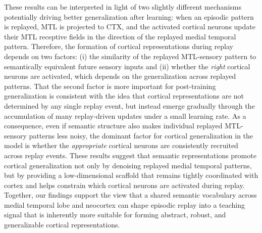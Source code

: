 \documentclass{article}
\begin{document}
\newline\newline
These results can be interpreted in light of two slightly different mechanisms potentially driving better generalization after learning: when an episodic pattern is replayed, MTL is projected to CTX, and the activated cortical neurons update their MTL receptive fields in the direction of the replayed medial temporal pattern. Therefore, the formation of cortical representations during replay depends on two factors: (i) the similarity of the replayed MTL-sensory pattern to semantically equivalent future sensory inputs and (ii) whether the \textit{right} cortical neurons are activated, which depends on the generalization across replayed patterns. That the second factor is more important for post-training generalization is consistent with the idea that cortical representations are not determined by any single replay event, but instead emerge gradually through the accumulation of many replay-driven updates under a small learning rate. As a consequence, even if semantic structure also makes individual replayed MTL-sensory patterns less noisy, the dominant factor for cortical generalization in the model is whether the \textit{appropriate} cortical neurons are consistently recruited across replay events.
\newline\newline
These results suggest that semantic representations promote cortical generalization not only by denoising replayed medial temporal patterns, but by providing a low-dimensional scaffold that remains tightly coordinated with cortex and helps constrain which cortical neurons are activated during replay. Together, our findings support the view that a shared semantic vocabulary across medial temporal lobe and neocortex can shape episodic replay into a teaching signal that is inherently more suitable for forming abstract, robust, and generalizable cortical representations.
\end{document}
